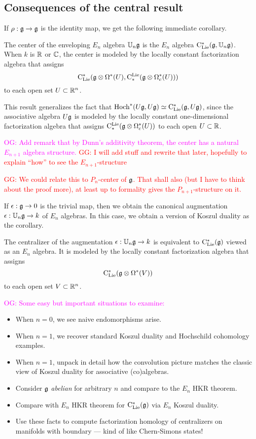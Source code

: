 \documentclass[11pt]{amsart}
\numberwithin{equation}{section}
\def\owen{\textcolor{magenta}{OG: }\textcolor{magenta}}
\def\greg{\textcolor{red}{GG: }\textcolor{red}}
\begin{document}
\subsection{Consequences of the central result}

If $\rho: \mathfrak g \to \mathfrak g$ is the identity map, we get the following immediate corollary.

\begin{cor}
\label{thm: center}
The center of the enveloping $E_n$ algebra $\mathbb U_n\mathfrak g$ is the $E_n$ algebra ${\rm C}_{\rm Lie}^*(\mathfrak g, \mathbb U_n\mathfrak g)$. 
When $k$ is $\mathbb R$ or $\mathbb C$, the 
center is modeled by the locally constant factorization algebra that assigns
\[
{\rm C}_{\rm Lie}^*(\mathfrak g \otimes \Omega^*(U), {\rm C}^{\rm Lie}_*( \mathfrak g \otimes \Omega^*_c(U)))
\]
to each open set $U \subset \mathbb R^n$.
\end{cor}

This result generalizes the fact that ${\rm Hoch}^*(U\mathfrak g,U\mathfrak g) \simeq {\rm C}_{\rm Lie}^*(\mathfrak g, U\mathfrak g)$, 
since the associative algebra $U\mathfrak g$ is modeled by the locally constant one-dimensional factorization algebra that assigns
${\rm C}^{\rm Lie}_* (\mathfrak g \otimes \Omega^*_c(U))$ to each open $U \subset \mathbb R$. 

\owen{Add remark that by Dunn's additivity theorem, the center has a natural $E_{n+1}$ algebra structure.}
\greg{I will add stuff and rewrite that later, hopefully to explain ``how'' to see the $E_{n+1}$-structure}

\greg{We could relate this to $P_n$-center of $\mathfrak g$. That shall also (but I have to think about the proof more), 
at least up to formality gives the $P_{n+1}$-structure on it. }

If $\epsilon: \mathfrak g \to 0$ is the trivial map, then we obtain the canonical augmentation $\epsilon: \mathbb U_n \mathfrak g \to k$ of $E_n$ algebras.
In this case, we obtain a version of Koszul duality as the corollary.

\begin{cor}
\label{thm: koszul duality}
The centralizer of the augmentation $\epsilon: \mathbb U_n \mathfrak g \to k$ is equivalent to ${\rm C}_{\rm Lie}^*(\mathfrak g)$ viewed as an $E_n$ algebra. It is modeled by the locally constant factorization algebra that assigns
\[
{\rm C}_{\rm Lie}^*(\mathfrak g \otimes \Omega^*(V))
\]
to each open set $V \subset \mathbb R^n$.
\end{cor}

\owen{Some easy but important situations to examine:}
\begin{itemize}
\item When $n=0$, we see naive endomorphisms arise.
\item When $n=1$, we recover standard Koszul duality and Hochschild cohomology examples.
\item When $n=1$, unpack in detail how the convolution picture matches the classic view of Koszul duality for associative (co)algebras.
\item Consider $\mathfrak g$ {\em abelian} for arbitrary $n$ and compare to the $E_n$ HKR theorem.
\item Compare with $E_n$ HKR theorem for ${\rm C}_{\rm Lie}^*(\mathfrak g)$ via $E_n$ Koszul duality.
\item Use these facts to compute factorization homology of centralizers on manifolds with boundary --- kind of like Chern-Simons states!
\end{itemize}
\end{document}
